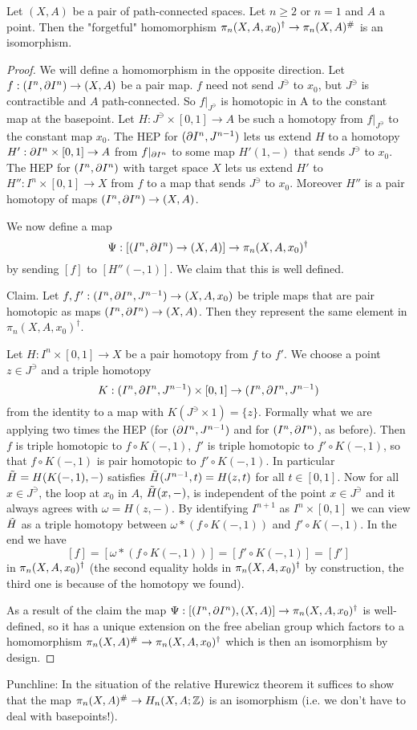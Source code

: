 \begin{proposition}
Let $(X,A)$ be a pair of path-connected spaces. Let $n\geq2$ or $n=1$ and $A$ a point. Then the "forgetful" homomorphism $\pi_n(X,A,x_0)^\dagger\to\pi_n(X,A)^\#$ is an isomorphism.
\end{proposition}

\begin{proof}
We will define a homomorphism in the opposite direction. Let $f:(I^n,\partial I^n)\to (X,A)$ be a pair map. $f$ need not send $J^\ni$ to $x_0$, but $J^\ni$ is contractible and $A$ path-connected. So $f|_{J^\ni}$ is homotopic in A to the constant map at the basepoint. Let $H:J^\ni\times[0,1]\to A$ be such a homotopy from $f|_{J^\ni}$ to the constant map $x_0$. The HEP for $(\partial I^n,J^{n-1})$ lets us extend $H$ to a homotopy $H':\partial I^n\times[0,1]\to A$ from $f|_{\partial I^n}$ to some map $H'(1,-)$ that sends $J^\ni$ to $x_0$. The HEP for $(I^n,\partial I^n)$ with target space $X$ lets us extend $H'$ to $H'':I^n\times[0,1]\to X$ from $f$ to a map that sends $J^\ni$ to $x_0$. Moreover $H''$ is a pair homotopy of maps $(I^n,\partial I^n)\to (X,A)$.

We now define a map \[\Psi:[(I^n,\partial I^n)\to (X,A)]\to \pi_n(X,A,x_0)^\dagger\]
by sending $[f]$ to $[H''(-,1)]$. We claim that this is well defined.
 
Claim. Let $f,f':(I^n,\partial I^n, J^{n-1})\to(X,A,x_0)$ be triple maps that are pair homotopic as maps $(I^n,\partial I^n)\to (X,A)$. Then they represent the same element in $\pi_n(X,A,x_0)^\dagger$.

\begin{claimproof}
Let $H:I^n\times[0,1]\to X$ be a pair homotopy from $f$ to $f'$. We choose a point $z\in J^\ni$ and a triple homotopy
\[K:(I^n,\partial I^n,J^{n-1})\times[0,1]\to(I^n,\partial I^n,J^{n-1})\]
from the identity to a map with $K(J^\ni\times 1)=\{z\}$. Formally what we are applying two times the HEP (for $(\partial I^n,J^{n-1})$ and for $(I^n,\partial I^n)$, as before). Then $f$ is triple homotopic to $f\circ K(-,1)$, $f'$ is triple homotopic to $f'\circ K(-,1)$, so that $f\circ K(-,1)$ is pair homotopic to $f'\circ K(-,1)$. In particular $\tilde{H}=H(K(-,1),-)$ satisfies $\tilde{H}(J^{n-1},t)=H(z,t)$ for all $t\in [0,1]$. Now for all $x\in J^\ni$, the loop at $x_0$ in $A$, $\tilde{H}(x,-)$, is independent of the point $x\in J^\ni$ and it always agrees with $\omega=H(z,-)$. By identifying $I^{n+1}$ as $I^n\times[0,1]$ we can view $\tilde{H}$ as a triple homotopy between $\omega * (f\circ K(-,1))$ and $f'\circ K(-,1)$.\normalmarginpar{} In the end we have
\[[f]=[\omega * (f\circ K(-,1))]=[f'\circ K(-,1)]=[f']\] in $\pi_n(X,A,x_0)^\dagger$ (the second equality holds in $\pi_n(X,A,x_0)^\dagger$ by construction, the third one is because of the homotopy we found).
\end{claimproof}

As a result of the claim the map $\Psi:[(I^n,\partial I^n),(X,A)]\to\pi_n(X,A,x_0)^\dagger$ is well-defined, so it has a unique extension on the free abelian group which factors to a homomorphism $\pi_n(X,A)^\#\to\pi_n(X,A,x_0)^\dagger$ which is then an isomorphism by design.
\end{proof}
 
Punchline: In the situation of the relative Hurewicz theorem it suffices to show that the map $\pi_n(X,A)^\#\to H_n(X,A;{\mathbb Z})$ is an isomorphism (i.e. we don't have to deal with basepoints!).
